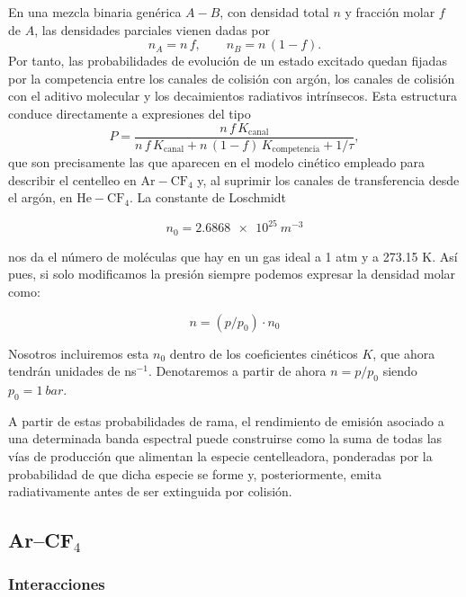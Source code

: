 \documentclass[12pt,a4paper]{article}
\newcommand{\He}{\mathrm{He}}
\newcommand{\Ar}{\mathrm{Ar}}
\newcommand{\CF}{\mathrm{CF}}
\begin{document}
En una mezcla binaria genérica \(A-B\), con densidad total \(n\) y fracción molar \(f\) de \(A\), las densidades parciales vienen dadas por
\begin{equation}
    n_{A}=n\,f,
    \qquad
    n_{B}=n\,(1-f).
\end{equation}
Por tanto, las probabilidades de evolución de un estado excitado quedan fijadas por la competencia entre los canales de colisión con argón, los canales de colisión con el aditivo molecular y los decaimientos radiativos intrínsecos. Esta estructura conduce directamente a expresiones del tipo
\begin{equation}
    P
    =
    \frac{n\,f\,K_{\text{canal}}}
    {n\,f\,K_{\text{canal}}
    +
    n\,(1-f)\,K_{\text{competencia}}
    +
    1/\tau},
    \label{eq:generic_probability_binary_mixture}
\end{equation}
que son precisamente las que aparecen en el modelo cinético empleado para describir el centelleo en $\Ar-\CF_4$ y, al suprimir los canales de transferencia desde el argón, en $\He-\CF_4$. La constante de Loschmidt 

$$ n_0 = \SI{2.6868e25}{m^{-3}} $$

nos da el número de moléculas que hay en un gas ideal a 1 atm y a 273.15 K. Así pues, si solo modificamos la presión siempre podemos expresar la densidad molar como:  

$$ n = (p/p_0) \cdot  n_0 $$

Nosotros incluiremos esta $n_0$ dentro de los coeficientes cinéticos $K$, que ahora tendrán unidades de ns$^{-1}$. Denotaremos a partir de ahora $n=p/p_0$ siendo $p_0 = \SI{1}{bar}$.

A partir de estas probabilidades de rama, el rendimiento de emisión asociado a una determinada banda espectral puede construirse como la suma de todas las vías de producción que alimentan la especie centelleadora, ponderadas por la probabilidad de que dicha especie se forme y, posteriormente, emita radiativamente antes de ser extinguida por colisión. 

\subsection{Ar--CF$_4$} \label{subbsec:kinArCF4}

\subsubsection{Interacciones}
\end{document}
